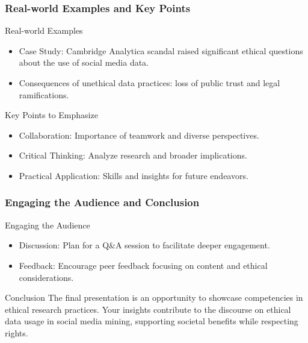\documentclass{beamer}
\begin{document}
\begin{frame}[fragile]
    \frametitle{Real-world Examples and Key Points}
    \begin{block}{Real-world Examples}
        \begin{itemize}
            \item Case Study: Cambridge Analytica scandal raised significant ethical questions about the use of social media data.
            \item Consequences of unethical data practices: loss of public trust and legal ramifications.
        \end{itemize}
    \end{block}
    
    \begin{block}{Key Points to Emphasize}
        \begin{itemize}
            \item Collaboration: Importance of teamwork and diverse perspectives.
            \item Critical Thinking: Analyze research and broader implications.
            \item Practical Application: Skills and insights for future endeavors.
        \end{itemize}
    \end{block}
\end{frame}

\begin{frame}[fragile]
    \frametitle{Engaging the Audience and Conclusion}
    \begin{block}{Engaging the Audience}
        \begin{itemize}
            \item Discussion: Plan for a Q\&A session to facilitate deeper engagement.
            \item Feedback: Encourage peer feedback focusing on content and ethical considerations.
        \end{itemize}
    \end{block}

    \begin{block}{Conclusion}
        The final presentation is an opportunity to showcase competencies in ethical research practices. Your insights contribute to the discourse on ethical data usage in social media mining, supporting societal benefits while respecting rights.
    \end{block}
\end{frame}
\end{document}
